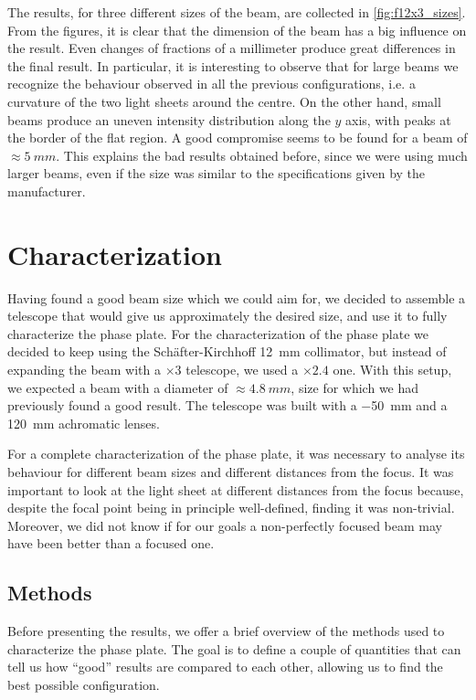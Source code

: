 The results, for three different sizes of the beam, are collected in \cref{fig:f12x3_sizes}. From the figures, it is clear that the dimension of the beam has a big influence on the result. Even changes of fractions of a millimeter produce great differences in the final result. In particular, it is interesting to observe that for large beams we recognize the behaviour observed in all the previous configurations, i.e. a curvature of the two light sheets around the centre. On the other hand, small beams produce an uneven intensity distribution along the $y$ axis, with peaks at the border of the flat region. A good compromise seems to be found for a beam of $\approx \SI{5}{mm}$. This explains the bad results obtained before, since we were using much larger beams, even if the size was similar to the specifications given by the manufacturer.

\section{Characterization}
\label{sec:characterization}
Having found a good beam size which we could aim for, we decided to assemble a telescope that would give us approximately the desired size, and use it to fully characterize the phase plate. For the characterization of the phase plate we decided to keep using the Schäfter-Kirchhoff \SI{12}{mm} collimator, but instead of expanding the beam with a $\times3$ telescope, we used a $\times2.4$ one. With this setup, we expected a beam with a diameter of $\approx \SI{4.8}{mm}$, size for which we had previously found a good result. The telescope was built with a \SI{-50}{mm} and a \SI{120}{mm} achromatic lenses.

For a complete characterization of the phase plate, it was necessary to analyse its behaviour for different beam sizes and different distances from the focus. It was important to look at the light sheet at different distances from the focus because, despite the focal point being in principle well-defined, finding it was non-trivial. Moreover, we did not know if for our goals a non-perfectly focused beam may have been better than a focused one.

\subsection{Methods}
\label{sec:characterization_methods}
Before presenting the results, we offer a brief overview of the methods used to characterize the phase plate. The goal is to define a couple of quantities that can tell us how \enquote{good} results are compared to each other, allowing us to find the best possible configuration.

